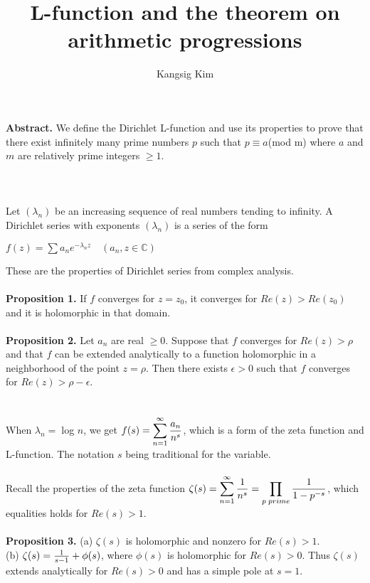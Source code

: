 \documentclass[11pt]{article}
\title{L-function and the theorem on arithmetic progressions}
\author{Kangsig Kim}
\begin{document}
\maketitle
\textbf{Abstract.} We define the Dirichlet L-function and use its properties to prove that there exist infinitely many prime numbers $p$ such that $p\equiv a$(mod m) where $a$ and $m$ are relatively prime integers $\geq1$.
\\
\\
\\
\\
Let $(\lambda_n)$ be an increasing sequence of real numbers tending to infinity. A Dirichlet series with exponents $(\lambda_n)$ is a series of the form
\begin{center}
    $f(z)=\sum a_n e^{-\lambda_n z} \quad (a_n, z\in \mathbb{C})$
\end{center}
These are the properties of Dirichlet series from complex analysis.
\\
\\
\textbf{Proposition 1.}
If $f$ converges for $z=z_0$, it converges for $Re(z)>Re(z_0)$ and it is holomorphic in that domain. \\\\
\textbf{Proposition 2.}
Let $a_n$ are real $\geq0$. Suppose that $f$ converges for $Re(z)>\rho$ and that $f$ can be extended analytically to a function holomorphic in a neighborhood of the point $z=\rho$. Then there exists $\epsilon>0$ such that $f$ converges for $Re(z)>\rho-\epsilon$.
\\
\\
\\
When $\lambda_n=\;$log $n$, we get $f(s)=\displaystyle\sum_{n=1}^{\infty} {a_n\over n^s}$, which is a form of the zeta function and L-function. The notation $s$ being traditional for the variable.
\\
\\
Recall the properties of the zeta function $\zeta(s)=\displaystyle\sum_{n=1}^{\infty} {1\over n^s}=\displaystyle\prod_{p \; prime} {1\over 1-p^{-s}}$, which equalities holds for $Re(s)>1$.
\\
\\
\textbf{Proposition 3.}
(a) $\zeta(s)$ is holomorphic and nonzero for $Re(s)>1$. \\
(b) $\zeta(s)={1\over s-1}+\phi(s)$, where $\phi(s)$ is holomorphic for $Re(s)>0$. Thus $\zeta(s)$ extends analytically for $Re(s)>0$ and has a simple pole at $s=1$.
\\
\\
\end{document}
